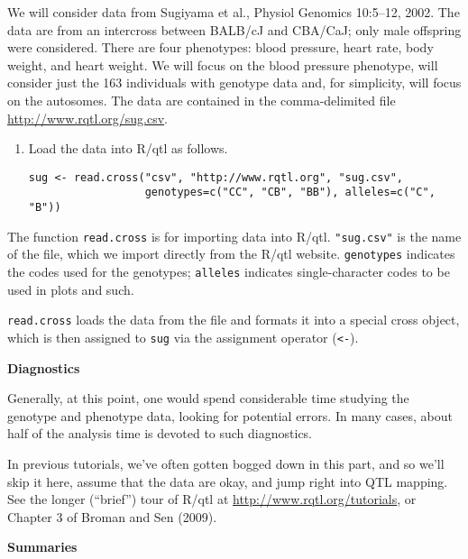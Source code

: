 \documentclass[10pt,letterpaper]{article}
\newcommand{\usercolor}{\color [named]{BlueViolet}}
\begin{document}
We will consider data from Sugiyama et al., Physiol Genomics 10:5--12,
2002. 
The
data are from an intercross between BALB/cJ and CBA/CaJ; only male
offspring were considered.  There are four phenotypes: blood pressure,
heart rate, body weight, and heart weight.  We will focus on the blood
pressure phenotype, will consider just the 163 individuals with
genotype data and, for simplicity, will focus on the autosomes.
The data are contained in the comma-delimited file
\href{http://www.rqtl.org/sug.csv}{http://www.rqtl.org/sug.csv}.  

\begin{enumerate}
\addtocounter{enumi}{5}

\item Load the data into R/qtl as follows.

\usercolor 
\verb|sug <- read.cross("csv", "http://www.rqtl.org", "sug.csv",| \\
\verb|                  genotypes=c("CC", "CB", "BB"), alleles=c("C", "B"))|
\normalcolor
\end{enumerate}

The function \verb-read.cross- is for importing data into R/qtl.
\verb-"sug.csv"- is the name of the file, which we import directly
from the R/qtl website.  \verb-genotypes- indicates the codes used for
the genotypes; \verb-alleles- indicates single-character codes to be
used in plots and such.
\vspace{12pt}

\verb-read.cross- loads the data from the file and formats it into
a special cross object, which is then assigned to \verb-sug- via the
assignment operator (\verb:<-:).  


\clearpage
\textbf{Diagnostics} \vspace{6pt}

Generally, at this point, one would spend considerable time studying
the genotype and phenotype data, looking for potential errors.  In
many cases, about half of the analysis time is devoted to such
diagnostics.  

\vspace{12pt}

In previous tutorials, we've often gotten bogged down in this part,
and so we'll skip it here, assume that the data are okay, and
jump right into QTL mapping.  See the longer (``brief'') tour of R/qtl
at
\href{http://www.rqtl.org/tutorials}{http://www.rqtl.org/tutorials},
or Chapter 3 of Broman and Sen (2009).


\vspace{12pt}
\textbf{Summaries} \vspace{6pt}
\nopagebreak
\end{document}
